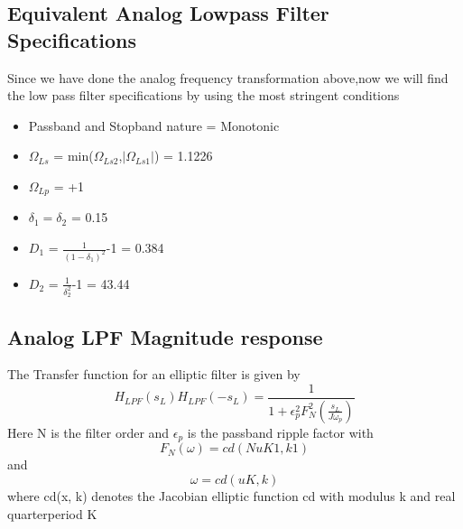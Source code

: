\documentclass[12pt]{article}
\begin{document}
\subsection{\textbf{Equivalent Analog Lowpass Filter Specifications}}
Since we have done the analog frequency transformation above,now we will find the low pass filter specifications by using the most stringent conditions \\
\begin{itemize}
    \item Passband and Stopband nature = Monotonic
    \item $\Omega_{Ls}$ = min($\Omega_{Ls2}$,$\left|\Omega_{Ls1}\right|$) = 1.1226
    \item $\Omega_{Lp}$ = +1
    \item $\delta_1 = \delta_2$ = 0.15
    \item $D_1$ = $\frac{1}{(1-\delta_1)^2}$-1 = 0.384
    \item $D_2$ = $\frac{1}{\delta_2^2}$-1 = 43.44
\end{itemize}
\subsection{\textbf{Analog LPF Magnitude response}}
The  Transfer function for an elliptic filter is given by
\begin{equation*}
    H_{LPF}(s_L)H_{LPF}(-s_L) = \frac{1}{1+\epsilon_p ^2 F_N ^2(\frac{s_L}{J\omega_p})}
\end{equation*}
Here N is the filter order and $\epsilon_p$ is the passband ripple factor with
\begin{equation*}
        F_N(\omega) = cd(NuK1, k1)
\end{equation*}
and
\begin{equation*}
        \omega = cd(uK, k)
\end{equation*}
where cd(x, k) denotes the Jacobian elliptic function cd with modulus k and real
quarter­period K
\end{document}
